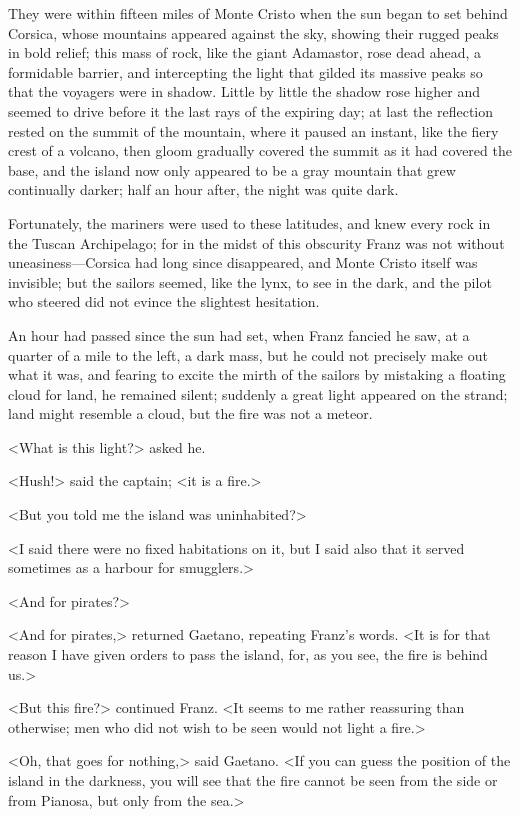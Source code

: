  They were within fifteen miles of Monte Cristo when the sun began to set behind Corsica, whose mountains appeared against the sky, showing their rugged peaks in bold relief; this mass of rock, like the giant Adamastor, rose dead ahead, a formidable barrier, and intercepting the light that gilded its massive peaks so that the voyagers were in shadow. Little by little the shadow rose higher and seemed to drive before it the last rays of the expiring day; at last the reflection rested on the summit of the mountain, where it paused an instant, like the fiery crest of a volcano, then gloom gradually covered the summit as it had covered the base, and the island now only appeared to be a gray mountain that grew continually darker; half an hour after, the night was quite dark. 

 Fortunately, the mariners were used to these latitudes, and knew every rock in the Tuscan Archipelago; for in the midst of this obscurity Franz was not without uneasiness—Corsica had long since disappeared, and Monte Cristo itself was invisible; but the sailors seemed, like the lynx, to see in the dark, and the pilot who steered did not evince the slightest hesitation. 

 An hour had passed since the sun had set, when Franz fancied he saw, at a quarter of a mile to the left, a dark mass, but he could not precisely make out what it was, and fearing to excite the mirth of the sailors by mistaking a floating cloud for land, he remained silent; suddenly a great light appeared on the strand; land might resemble a cloud, but the fire was not a meteor. 

 <What is this light?> asked he. 

 <Hush!> said the captain; <it is a fire.> 

 <But you told me the island was uninhabited?> 

 <I said there were no fixed habitations on it, but I said also that it served sometimes as a harbour for smugglers.> 

 <And for pirates?> 

 <And for pirates,> returned Gaetano, repeating Franz's words. <It is for that reason I have given orders to pass the island, for, as you see, the fire is behind us.> 

 <But this fire?> continued Franz. <It seems to me rather reassuring than otherwise; men who did not wish to be seen would not light a fire.> 

 <Oh, that goes for nothing,> said Gaetano. <If you can guess the position of the island in the darkness, you will see that the fire cannot be seen from the side or from Pianosa, but only from the sea.> 

